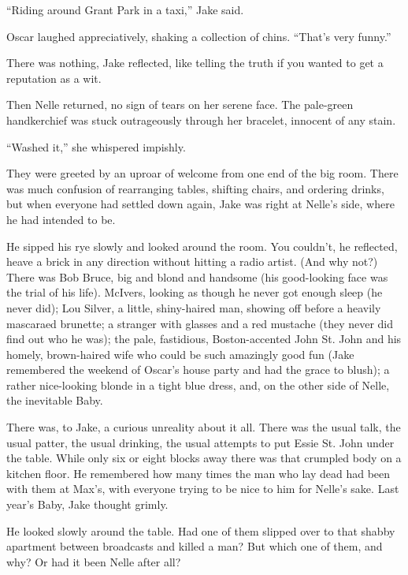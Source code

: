 \documentclass{novel}
\begin{document}
“Riding around Grant Park in a taxi,” Jake said.

Oscar laughed appreciatively, shaking a collection of chins. “That’s very funny.”

There was nothing, Jake reflected, like telling the truth if you wanted to get a reputation as a wit.

Then Nelle returned, no sign of tears on her serene face. The pale-green handkerchief was stuck outrageously through her bracelet, innocent of any stain.

“Washed it,” she whispered impishly.

They were greeted by an uproar of welcome from one end of the big room. There was much confusion of rearranging tables, shifting chairs, and ordering drinks, but when everyone had settled down again, Jake was right at Nelle’s side, where he had intended to be.

He sipped his rye slowly and looked around the room. You couldn’t, he reflected, heave a brick in any direction without hitting a radio artist. (And why not?) There was Bob Bruce, big and blond and handsome (his good-looking face was the trial of his life). McIvers, looking as though he never got enough sleep (he never did); Lou Silver, a little, shiny-haired man, showing off before a heavily mascaraed brunette; a stranger with glasses and a red mustache (they never did find out who he was); the pale, fastidious, Boston-accented John St. John and his homely, brown-haired wife who could be such amazingly good fun (Jake remembered the weekend of Oscar’s house party and had the grace to blush); a rather nice-looking blonde in a tight blue dress, and, on the other side of Nelle, the inevitable Baby.

There was, to Jake, a curious unreality about it all. There was the usual talk, the usual patter, the usual drinking, the usual attempts to put Essie St. John under the table. While only six or eight blocks away there was that crumpled body on a kitchen floor. He remembered how many times the man who lay dead had been with them at Max’s, with everyone trying to be nice to him for Nelle’s sake. Last year’s Baby, Jake thought grimly.

He looked slowly around the table. Had one of them slipped over to that shabby apartment between broadcasts and killed a man? But which one of them, and why? Or had it been Nelle after all?

\begin{ChapterStart}
\vspace{3\nbs}
\end{ChapterStart}
\end{document}
